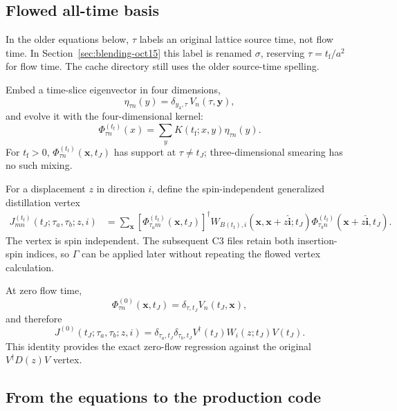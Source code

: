 \documentclass[11pt]{article}
\numberwithin{equation}{section}
\newcommand{\tf}{t_{\mathrm f}}
\begin{document}
\subsection{Flowed all-time basis}

In the older equations below, \(\tau\) labels an original lattice source
time, not flow time. In Section~\ref{sec:blending-oct15} this label is
renamed \(\sigma\), reserving \(\tau=\tf/a^2\) for flow time. The cache
directory  still uses the older source-time spelling.

Embed a time-slice eigenvector in four dimensions,
\begin{equation}
  \eta_{\tau n}(y)
  =
  \delta_{y_4,\tau}\,V_n(\tau,\bm y),
\end{equation}
and evolve it with the four-dimensional kernel:
\begin{equation}
  \Phi_{\tau n}^{(\tf)}(x)
  =
  \sum_y K(\tf;x,y)\eta_{\tau n}(y).
  \label{eq:flowed-basis}
\end{equation}
For \(\tf>0\), \(\Phi_{\tau n}^{(\tf)}(\bm x,t_J)\) has support at
\(\tau\ne t_J\); three-dimensional smearing has no such mixing.

For a displacement \(z\) in direction \(i\), define the spin-independent
generalized distillation vertex
\begin{align}
  J_{mn}^{(\tf)}
  (t_J;\tau_a,\tau_b;z,i)
  &=
  \sum_{\bm x}
  \left[
    \Phi_{\tau_a m}^{(\tf)}(\bm x,t_J)
  \right]^\dagger
  W_{B(\tf),i}(\bm x,\bm x+z\hat{\bm i};t_J)
  \Phi_{\tau_b n}^{(\tf)}
  (\bm x+z\hat{\bm i},t_J).
  \label{eq:generalized-vertex}
\end{align}
The vertex is spin independent.  The subsequent C3 files retain both
insertion-spin indices, so \(\Gamma\) can be applied later without repeating
the flowed vertex calculation.

At zero flow time,
\begin{equation}
  \Phi_{\tau n}^{(0)}(\bm x,t_J)
  =
  \delta_{\tau,t_J}V_n(t_J,\bm x),
\end{equation}
and therefore
\begin{equation}
  J^{(0)}(t_J;\tau_a,\tau_b;z,i)
  =
  \delta_{\tau_a,t_J}\delta_{\tau_b,t_J}
  V^\dagger(t_J)W_i(z;t_J)V(t_J).
  \label{eq:zero-flow-identity}
\end{equation}
This identity provides the exact zero-flow regression against the original
\(V^\dagger D(z)V\) vertex.

\subsection{From the equations to the production code}
\label{sec:basis-vertex-code}
\end{document}
